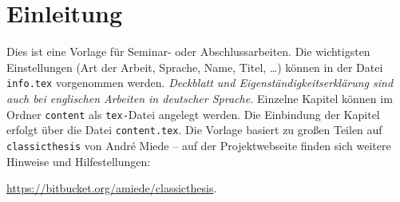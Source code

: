 \chapter{Einleitung}\label{ch:einleitung}
Dies ist eine Vorlage für Seminar- oder Abschlussarbeiten. Die wichtigsten Einstellungen (Art der Arbeit, Sprache, Name, Titel, \dots) können in der Datei \texttt{info.tex} vorgenommen werden. \emph{Deckblatt und Eigenständigkeitserklärung sind auch bei englischen Arbeiten in deutscher Sprache.} Einzelne Kapitel können im Ordner \texttt{content} als \texttt{tex-}Datei angelegt werden. Die Einbindung der Kapitel erfolgt über die Datei \texttt{content.tex}. Die Vorlage basiert zu großen Teilen auf \texttt{classicthesis} von André Miede -- auf der Projektwebseite finden sich weitere Hinweise und Hilfestellungen:

\begin{center}
\url{https://bitbucket.org/amiede/classicthesis}.
\end{center}
